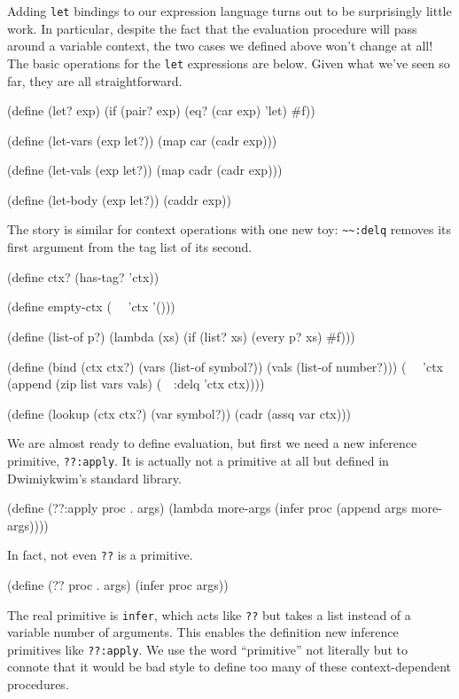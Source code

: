 \documentclass[11pt]{article}
\begin{document}
Adding \texttt{let} bindings to our expression language
turns out to be surprisingly little work.
In particular,
despite the fact that the evaluation procedure
will pass around a variable context,
the two cases we defined above won't change at all!
The basic operations for the \texttt{let} expressions are below.
Given what we've seen so far, they are all straightforward.
\begin{verbbox}
(define (let? exp)
  (if (pair? exp)
      (eq? (car exp) 'let)
      #f))

(define (let-vars (exp let?))
  (map car (cadr exp)))

(define (let-vals (exp let?))
  (map cadr (cadr exp)))

(define (let-body (exp let?))
  (caddr exp))
\end{verbbox}
\begin{quote}\theverbbox\end{quote}
The story is similar for context operations with one new toy:
\verb|~~:delq| removes its first argument from the tag list of its second.
\begin{verbbox}
(define ctx?
  (has-tag? 'ctx))

(define empty-ctx
  (~~ 'ctx '()))

(define (list-of p?)
  (lambda (xs)
    (if (list? xs)
        (every p? xs)
        #f)))

(define (bind (ctx ctx?)
              (vars (list-of symbol?))
              (vals (list-of number?)))
  (~~ 'ctx (append (zip list vars vals)
                   (~~:delq 'ctx ctx))))

(define (lookup (ctx ctx?)
                (var symbol?))
  (cadr (assq var ctx)))
\end{verbbox}
\begin{quote}\theverbbox\end{quote}

We are almost ready to define evaluation,
but first we need a new inference primitive, \texttt{??:apply}.
It is actually not a primitive at all
but defined in Dwimiykwim's standard library.
\begin{verbbox}
(define (??:apply proc . args)
  (lambda more-args
    (infer proc (append args more-args))))
\end{verbbox}
\begin{quote}\theverbbox\end{quote}
In fact, not even \texttt{??} is a primitive.
\begin{verbbox}
(define (?? proc . args)
  (infer proc args))
\end{verbbox}
\begin{quote}\theverbbox\end{quote}
The real primitive is \texttt{infer},
which acts like \texttt{??}
but takes a list instead of a variable number of arguments.
This enables the definition new inference primitives like \texttt{??:apply}.
We use the word ``primitive'' not literally
but to connote that it would be bad style to define too many of these
context-dependent procedures.
\end{document}
